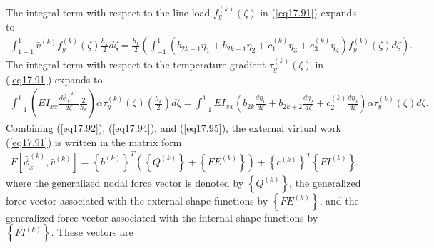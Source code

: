 \documentclass{AeroStructure-ERJohnson}
\begin{document}
The integral term with respect to the line load $f_{y}^{(k)}(\zeta)$ in (\ref{eq17.91}) expands to
\begin{align}\label{eq17.94}
\int_{1-1}^{1} \bar{v}^{(k)} f_{y}^{(k)}(\zeta) \frac{h_{k}}{2} d \zeta=\frac{h_{k}}{2}\left(\int_{-1}^{1}\left(b_{2 k-1} \eta_{1}+b_{2 k+1} \eta_{2}+c_{1}^{(k)} \eta_{3}+c_{3}^{(k)} \eta_{4}\right) f_{y}^{(k)}(\zeta) d \zeta\right).
\end{align}
The integral term with respect to the temperature gradient $\tau_{y}^{(k)}(\zeta)$ in (\ref{eq17.91}) expands to
\begin{align}\label{eq17.95}
\int_{-1}^{1}\left(E I_{x x} \frac{d \bar{\phi}_{x}^{(k)}}{d \zeta} \frac{2}{h_{k}}\right) \alpha \tau_{y}^{(k)}(\zeta)\left(\frac{h_{k}}{2}\right) d \zeta=\int_{-1}^{1} E I_{x x}\left(b_{2 k} \frac{d \eta_{1}}{d \zeta}+b_{2 k+2} \frac{d \eta_{2}}{d \zeta}+c_{2}^{(k)} \frac{d \eta_{3}}{d \zeta}\right) \alpha \tau_{y}^{(k)}(\zeta) d \zeta.
\end{align}
Combining (\ref{eq17.92}), (\ref{eq17.94}), and (\ref{eq17.95}), the external virtual work (\ref{eq17.91}) is written in the matrix form
\begin{align}\label{eq17.96}
F\left[\bar{\phi}_{x}^{(k)}, \bar{v}^{(k)}\right]=\left\{b^{(k)}\right\}^{T}\left(\left\{Q^{(k)}\right\}+\left\{F E^{(k)}\right\}\right)+\left\{c^{(k)}\right\}^{T}\left\{F I^{(k)}\right\},
\end{align}
where the generalized nodal force vector is denoted by $\left\{Q^{(k)}\right\}$, the generalized force vector associated with the external shape functions by $\left\{F E^{(k)}\right\}$, and the generalized force vector associated with the internal shape functions by $\left\{F I^{(k)}\right\}$. These vectors are
\end{document}
